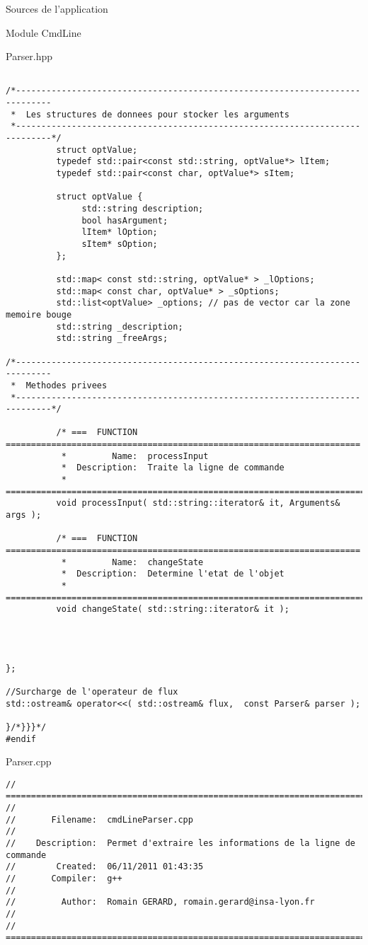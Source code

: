 \documentclass{article}
\begin{document}
\begin{section}{Sources de l'application}
\begin{subsection}{Module CmdLine}
\begin{paragraph}{Parser.hpp}
\begin{verbatim}
          
/*-----------------------------------------------------------------------------
 *  Les structures de donnees pour stocker les arguments
 *-----------------------------------------------------------------------------*/
          struct optValue;
          typedef std::pair<const std::string, optValue*> lItem;
          typedef std::pair<const char, optValue*> sItem;

          struct optValue {
               std::string description;
               bool hasArgument;
               lItem* lOption;
               sItem* sOption;
          };

          std::map< const std::string, optValue* > _lOptions;
          std::map< const char, optValue* > _sOptions;
          std::list<optValue> _options; // pas de vector car la zone memoire bouge
          std::string _description;
          std::string _freeArgs;

/*-----------------------------------------------------------------------------
 *  Methodes privees
 *-----------------------------------------------------------------------------*/

          /* ===  FUNCTION  ======================================================================
           *         Name:  processInput
           *  Description:  Traite la ligne de commande
           * =====================================================================================*/
          void processInput( std::string::iterator& it, Arguments& args );

          /* ===  FUNCTION  ======================================================================
           *         Name:  changeState
           *  Description:  Determine l'etat de l'objet
           * =====================================================================================*/
          void changeState( std::string::iterator& it );




};

//Surcharge de l'operateur de flux
std::ostream& operator<<( std::ostream& flux,  const Parser& parser );

}/*}}}*/
#endif
      \end{verbatim}
      \end{paragraph}
   

  \newpage
  \begin{paragraph}{Parser.cpp}
      \begin{verbatim}
// =====================================================================================
//
//       Filename:  cmdLineParser.cpp
//
//    Description:  Permet d'extraire les informations de la ligne de commande
//        Created:  06/11/2011 01:43:35
//       Compiler:  g++
//
//         Author:  Romain GERARD, romain.gerard@insa-lyon.fr
//
// =====================================================================================



\end{verbatim}
\end{paragraph}
\end{subsection}
\end{section}
\end{document}
